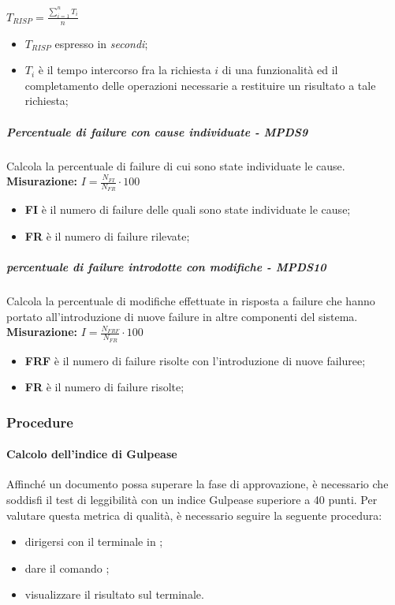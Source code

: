 $T_{RISP} = \frac{\sum_{i=1}^{n} T_{i}}{n}$
\begin{itemize}
	\item \textbf{$T_{RISP}$} espresso in \textit{secondi};
	\item \textbf{$T_{i}$} è il tempo intercorso fra la richiesta $i$ di una funzionalità ed il completamento delle operazioni necessarie a restituire un risultato a tale richiesta;
\end{itemize}
\subparagraph{Percentuale di failure con cause individuate - MPDS9}
Calcola la percentuale di failure di cui sono state individuate le cause.
\textbf{Misurazione:}
$I=\frac{N_{FI}}{N_{FR}} \cdot 100$
\begin{itemize}
	\item \textbf{FI}  è il numero di failure delle quali sono state individuate le cause;
	\item \textbf{FR} è il numero di failure rilevate;
\end{itemize}
\subparagraph{percentuale di failure introdotte con modifiche - MPDS10}
Calcola la percentuale di modifiche effettuate in risposta a failure che hanno portato all'introduzione di nuove failure in altre componenti del sistema.
\textbf{Misurazione:}
$I=\frac{N_{FRF}}{N_{FR}} \cdot 100$
\begin{itemize}
	\item \textbf{FRF}  è il numero di failure risolte con l'introduzione di nuove failuree;
	\item \textbf{FR} è il numero di failure risolte;
\end{itemize}

\subsubsection{Procedure}
\paragraph{Calcolo dell'indice di Gulpease}
Affinché un documento possa superare la fase di approvazione, è necessario che soddisfi il test di leggibilità con un indice Gulpease superiore a 40 punti. Per valutare questa metrica di qualità, è necessario seguire la seguente procedura:
\begin{itemize}
	\item dirigersi con il terminale in \GulScript;
	\item dare il comando ;
	\item visualizzare il risultato sul terminale.
\end{itemize}

